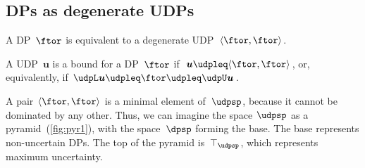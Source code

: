 \subsection{DPs as degenerate UDPs}

A DP~$\ftor$ is equivalent to a degenerate UDP~$\langle\ftor,\ftor\rangle$.

A UDP~$\boldsymbol{u}$ is a bound for a DP~$\ftor$ if~$\boldsymbol{u}\udpleq\langle\ftor,\ftor\rangle$,
or, equivalently, if $\udpL\boldsymbol{u}\udpleq\ftor\udpleq\udpU\boldsymbol{u}$.


A pair $\langle\ftor,\ftor\rangle$ is a minimal element of~$\udpsp$,
because it cannot be dominated by any other. Thus, we can imagine
the space $\udpsp$ as a pyramid~(\cref{fig:pyr1}), with the
space~$\dpsp$ forming the base. The base represents non-uncertain
DPs. The top of the pyramid is~$\top_{\udpsp}$, which represents
maximum uncertainty.

